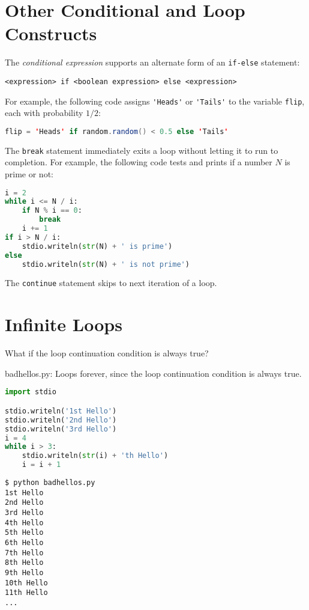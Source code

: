 \documentclass[8pt,a4paper,compress,handout]{beamer}
\begin{document}
\section{Other Conditional and Loop Constructs}
\begin{frame}[fragile]
The \emph{conditional expression} supports an alternate form of an \lstinline$if-else$ statement:
 
\begin{lstlisting}[language={}]
<expression> if <boolean expression> else <expression>
\end{lstlisting}

For example, the following code assigns \lstinline{'Heads'} or \lstinline{'Tails'} to the variable \lstinline{flip}, each with probability $1/2$:

\begin{lstlisting}[language=Java]
flip = 'Heads' if random.random() < 0.5 else 'Tails'
\end{lstlisting}

\bigskip

The \lstinline{break} statement immediately exits a loop without letting it to run to completion. For example, the following code tests and prints if a number $N$ is prime or not:
\begin{lstlisting}[language=Python]
i = 2
while i <= N / i:
    if N % i == 0:
        break
    i += 1
if i > N / i:
    stdio.writeln(str(N) + ' is prime')
else 
    stdio.writeln(str(N) + ' is not prime')
\end{lstlisting}

\bigskip

The \lstinline{continue} statement skips to next iteration of a loop.
\end{frame}

\section{Infinite Loops}
\begin{frame}[fragile]
What if the loop continuation condition is always true? 

\bigskip 
 
\begin{framed}
\tiny badhellos.py: Loops forever, since the loop continuation condition is always true.
\end{framed}

\begin{lstlisting}[language=Python]
import stdio

stdio.writeln('1st Hello')
stdio.writeln('2nd Hello')
stdio.writeln('3rd Hello')
i = 4
while i > 3:
    stdio.writeln(str(i) + 'th Hello')
    i = i + 1
\end{lstlisting}

\begin{lstlisting}[language={}]
$ python badhellos.py 
1st Hello
2nd Hello
3rd Hello
4th Hello
5th Hello
6th Hello
7th Hello
8th Hello
9th Hello
10th Hello
11th Hello
...
\end{lstlisting}
\end{frame}
\end{document}
